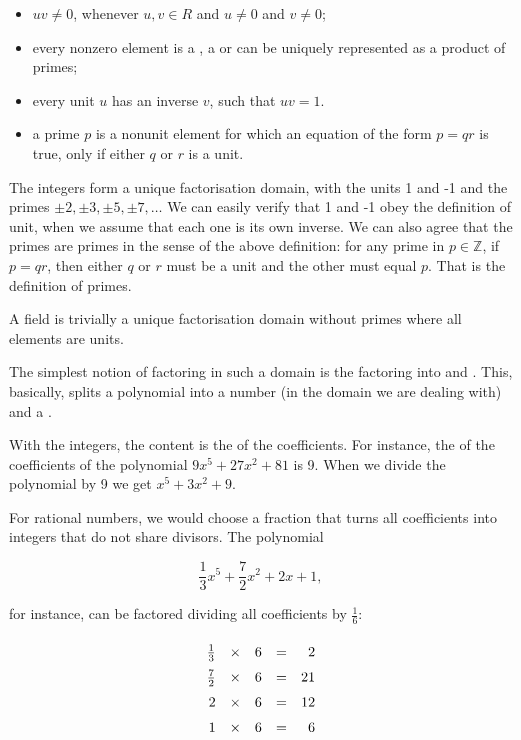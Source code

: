 \documentclass[tikz]{scrreprt}
\begin{document}
\begin{itemize}
\item $uv \neq 0$, whenever $u,v \in R$ and 
      $u \neq 0$ and $v \neq 0$;
\item every nonzero element is a ,
      a  or can be uniquely represented 
      as a product of primes;
\item every unit $u$ has an inverse $v$, such that
      $uv = 1$.
\item a prime $p$ is a nonunit element for which an
      equation of the form $p = qr$ is true, only 
      if either $q$ or $r$ is a unit.
\end{itemize} 

The integers form a unique factorisation domain,
with the units 1 and -1 and the primes 
$\pm 2, \pm 3, \pm 5, \pm 7, \dots$
We can easily verify that 1 and -1 obey
the definition of unit, 
when we assume that each one is its own inverse.
We can also agree that the primes are primes
in the sense of the above definition: for any prime
in $p \in \mathbb{Z}$, if $p = qr$, then either 
$q$ or $r$ must be a unit and the other must equal $p$.
That is the definition of primes.

A field is trivially a unique factorisation domain
without primes where all elements are units.

The simplest notion of factoring in such a domain
is the factoring into  and
. This, basically, splits a polynomial
into a number (in the domain we are dealing with) and
a . 

With the integers, the content is the  of the
coefficients. For instance, the  
of the coefficients of the polynomial 
$9x^5 + 27x^2 + 81$ is 9. 
When we divide the polynomial by 9 we get
$x^5 + 3x^2 + 9$.

For rational numbers, we would choose a fraction
that turns all coefficients into integers that do
not share divisors. The polynomial

\[
\frac{1}{3}x^5 + \frac{7}{2}x^2 + 2x + 1,
\]

for instance, can be factored dividing 
all coefficients by $\frac{1}{6}$:

\[
\begingroup
\renewcommand{\arraystretch}{1.5}
\begin{array}{rcrcr}
\frac{1}{3} & \times & 6 & = & 2\\
\frac{7}{2} & \times & 6 & = & 21\\
2 & \times & 6 & = & 12\\
1 & \times & 6 & = & 6
\end{array}
\endgroup
\]
\end{document}
